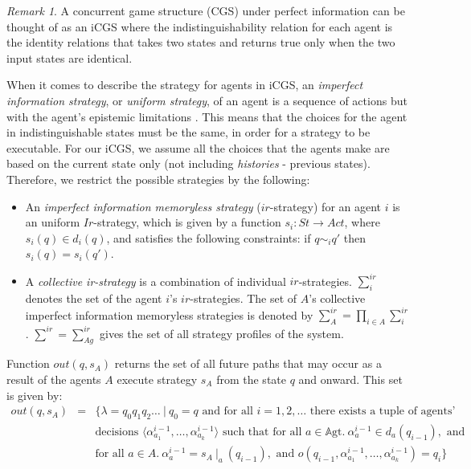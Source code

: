 \documentclass{article}
\theoremstyle{theorem}
\theoremstyle{lemma}
\theoremstyle{definition}
\theoremstyle{remark}
\newtheorem*{remark}{Remark}
\begin{document}
\begin{remark}
A concurrent game structure (CGS) under perfect information can be thought of as an iCGS where the indistinguishability relation for each agent is the identity relations that takes two states and returns true only when the two input states are identical.
\end{remark}
\par When it comes to describe the strategy for agents in iCGS, an \textit{imperfect information strategy}, or \textit{uniform strategy}, of an agent is a sequence of actions but with the agent's epistemic limitations \citep{cgs}. This means that the choices for the agent in indistinguishable states must be the same, in order for a strategy to be executable. For our iCGS, we assume all the choices that the agents make are based on the current state only (not including \textit{histories} - previous states). Therefore, we restrict the possible strategies by the following:
\begin{itemize}
    \item An \textit{imperfect information memoryless strategy} ($ir$-strategy) for an agent $i$ is an uniform $Ir$-strategy, which is given by a function $s_i:St \rightarrow Act$, where $s_i(q) \in d_i(q)$, and satisfies the following constraints: if $q \sim_i q'$ then $s_i(q)=s_i(q')$.
    \item A \textit{collective ir-strategy} is a combination of individual $ir$-strategies. $\sum_{i}^{ir}$ denotes the set of the agent $i$'s $ir$-strategies. The set of $A$'s collective imperfect information memoryless strategies is denoted by $\sum_{A}^{ir}=\prod_{i \in A}^{} \sum_{i}^{ir}$. $\sum_{}^{ir} = \sum_{Ag}^{ir}$ gives the set of all strategy profiles of the system.
\end{itemize}
\par Function $out(q,s_A)$ returns the set of all future paths that may occur as a result of the agents $A$ execute strategy $s_A$ from the state $q$ and onward. This set is given by:
\begin{eqnarray*}
    out(q,s_A) & = & \{\lambda=q_0 q_1 q_2\ldots \:|\: q_0=q \text{ and for all } i=1,2,\ldots\text{ there exists a tuple of agents'}\\
    & & \text{decisions } \langle \alpha_{a_1}^{i-1},\ldots,\alpha_{a_k}^{i-1} \rangle \text{ such that for all } a \in \mathbb{A}\mathrm{gt}.\ \alpha_{a}^{i-1} \in d_a(q_{i-1}), \text{ and }\\
    & & \text{for all } a \in A.\ \alpha_{a}^{i-1}=s_A \:{|_a}\:(q_{i-1}),\text{ and } o(q_{i-1},\alpha_{a_1}^{i-1}, \ldots, \alpha_{a_k}^{i-1})=q_i \}
\end{eqnarray*}
\end{document}
